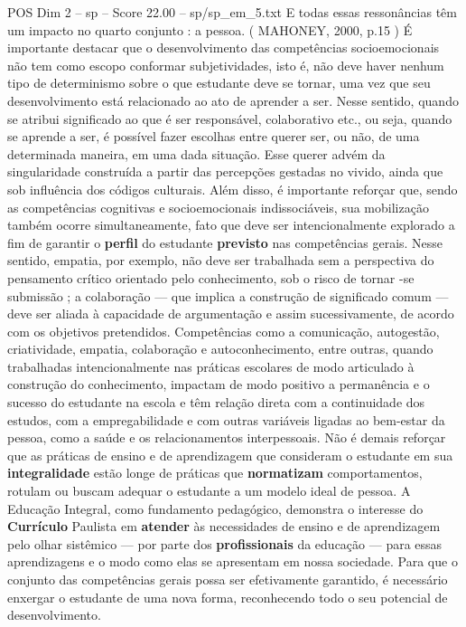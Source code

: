 \begin{textsample}{POS Dim 2 – sp – Score 22.00 – sp/sp\_em\_5.txt}
E todas essas ressonâncias têm um impacto no quarto conjunto : a pessoa. ( MAHONEY, 2000, p.15 ) É importante destacar que o desenvolvimento das competências socioemocionais não tem como escopo conformar subjetividades, isto é, não deve haver nenhum tipo de determinismo sobre o que estudante deve se tornar, uma vez que seu desenvolvimento está relacionado ao ato de aprender a ser.
Nesse sentido, quando se atribui significado ao que é ser responsável, colaborativo etc., ou seja, quando se aprende a ser, é possível fazer escolhas entre querer ser, ou não, de uma determinada maneira, em uma dada situação.
Esse querer advém da singularidade construída a partir das percepções gestadas no vivido, ainda que sob influência dos códigos culturais.
Além disso, é importante reforçar que, sendo as competências cognitivas e socioemocionais indissociáveis, sua mobilização também ocorre simultaneamente, fato que deve ser intencionalmente explorado a fim de garantir o \textbf{perfil} do estudante \textbf{previsto} nas competências gerais.
Nesse sentido, empatia, por exemplo, não deve ser trabalhada sem a perspectiva do pensamento crítico orientado pelo conhecimento, sob o risco de tornar -se submissão ; a colaboração — que implica a construção de significado comum — deve ser aliada à capacidade de argumentação e assim sucessivamente, de acordo com os objetivos pretendidos.
Competências como a comunicação, autogestão, criatividade, empatia, colaboração e autoconhecimento, entre outras, quando trabalhadas intencionalmente nas práticas escolares de modo articulado à construção do conhecimento, impactam de modo positivo a permanência e o sucesso do estudante na escola e têm relação direta com a continuidade dos estudos, com a empregabilidade e com outras variáveis ligadas ao bem-estar da pessoa, como a saúde e os relacionamentos interpessoais.
Não é demais reforçar que as práticas de ensino e de aprendizagem que consideram o estudante em sua \textbf{integralidade} estão longe de práticas que \textbf{normatizam} comportamentos, rotulam ou buscam adequar o estudante a um modelo ideal de pessoa.
A Educação Integral, como fundamento pedagógico, demonstra o interesse do \textbf{Currículo} Paulista em \textbf{atender} às necessidades de ensino e de aprendizagem pelo olhar sistêmico — por parte dos \textbf{profissionais} da educação — para essas aprendizagens e o modo como elas se apresentam em nossa sociedade.
Para que o conjunto das competências gerais possa ser efetivamente garantido, é necessário enxergar o estudante de uma nova forma, reconhecendo todo o seu potencial de desenvolvimento.

\end{textsample}
